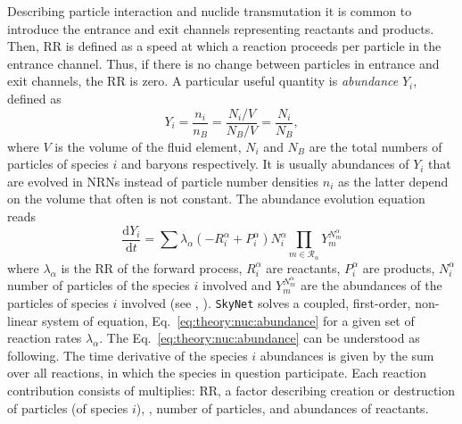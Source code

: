 Describing particle interaction and nuclide transmutation it is common to introduce the entrance 
and exit channels representing reactants and products. Then, \ac{RR} is defined as a speed 
at which a reaction proceeds per particle in the entrance channel. 
Thus, if there is no change between particles in entrance and exit channels, the \ac{RR} is zero. 
%
A particular useful quantity is \textit{abundance} $Y_i$, defined as 
%
\begin{equation}
\label{eq:theory:nuc:abundance}
Y_i = \frac{n_i}{n_B} = \frac{N_i/V}{N_B/V} = \frac{N_i}{N_B},
\end{equation}
%
where $V$ is the volume of the fluid element, $N_i$ and $N_B$ are the total numbers of particles 
of species $i$ and baryons respectively. 
It is usually abundances of $Y_i$ that are evolved in \acp{NRN} instead of 
particle number densities $n_i$ as the latter depend on the volume that often is not constant. 
%
The abundance evolution equation reads
%
\begin{equation}
\frac{\text{d}Y_i}{\text{d}t} = \sum\lambda_{\alpha}(-R_{i}^{\alpha}+P_{i}^{\alpha})N_{i}^{\alpha}\prod_{m\in\mathcal{R}_{\alpha}}Y_m^{N_{m}^{\alpha}}
\end{equation}
%
where $\lambda_{\alpha}$ is the \ac{RR} of the forward process, $R_{i}^{\alpha}$ are reactants, 
$P_{i}^{\alpha}$ are products, $N_{i}^{\alpha}$ number of particles of the species $i$ involved 
and $Y_m^{N_{m}^{\alpha}}$ are the abundances of the particles of species $i$ involved 
(see \eg, \citet{Hix:1999}).
%
\texttt{SkyNet} solves a coupled, first-order, non-linear system of equation, 
Eq.~\eqref{eq:theory:nuc:abundance} for a given set of reaction rates $\lambda_{\alpha}$. 
The Eq.~\eqref{eq:theory:nuc:abundance} can be understood as following. 
The time derivative of the species $i$ abundances is given by the sum over all reactions, 
in which the species in question participate. Each reaction contribution consists of multiplies: 
\ac{RR}, a factor describing creation or destruction of particles (of species $i$), 
\ie, number of particles, and abundances of reactants. 
%
